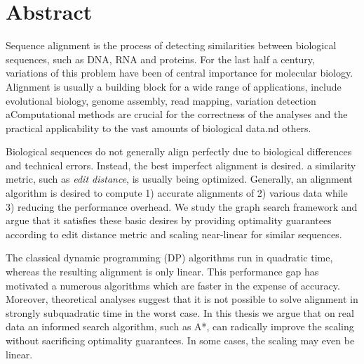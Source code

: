 \begingroup
\let\clearpage\relax
\let\cleardoublepage\relax
\let\cleardoublepage\relax

\chapter*{Abstract}

Sequence alignment is the process of detecting similarities between biological
sequences, such as DNA, RNA and proteins. For the last half a century,
variations of this problem have been of central importance for molecular
biology. Alignment is usually a building block for a wide range of applications,
include evolutional biology, genome assembly, read mapping, variation detection
aComputational methods are crucial for the correctness of the analyses and the
practical applicability to the vast amounts of biological data.nd others.

Biological sequences do not generally align perfectly due to biological
differences and technical errors. Instead, the best imperfect alignment is
desired. a similarity metric, such as \emph{edit distance}, is usually being
optimized. Generally, an alignment algorithm is desired to compute 1) accurate
alignments of 2) various data while 3) reducing the performance overhead. We
study the graph search framework and argue that it satisfies these basic desires
by providing optimality guarantees according to edit distance metric and scaling
near-linear for similar sequences.


The classical dynamic programming (DP) algorithms run in quadratic time, whereas
the resulting alignment is only linear. This performance gap has motivated a
numerous algorithms which are faster in the expense of accuracy. Moreover,
theoretical analyses suggest that it is not possible to solve alignment in
strongly subquadratic time in the worst case. In this thesis we argue that on
real data an informed search algorithm, such as A*, can radically improve the scaling
without sacrificing optimality guarantees. In some cases, the scaling may even
be linear.

